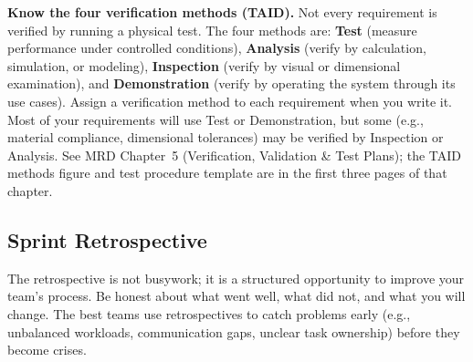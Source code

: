 \begin{tipbox}
\textbf{Know the four verification methods (TAID).} Not every requirement is verified by running a physical test. The four methods are: \textbf{Test} (measure performance under controlled conditions), \textbf{Analysis} (verify by calculation, simulation, or modeling), \textbf{Inspection} (verify by visual or dimensional examination), and \textbf{Demonstration} (verify by operating the system through its use cases). Assign a verification method to each requirement when you write it. Most of your requirements will use Test or Demonstration, but some (e.g., material compliance, dimensional tolerances) may be verified by Inspection or Analysis. See MRD Chapter~5 (Verification, Validation \& Test Plans); the TAID methods figure and test procedure template are in the first three pages of that chapter.
\end{tipbox}

\subsection{Sprint Retrospective}

\begin{faqbox}
The retrospective is not busywork; it is a structured opportunity to improve your team's process. Be honest about what went well, what did not, and what you will change. The best teams use retrospectives to catch problems early (e.g., unbalanced workloads, communication gaps, unclear task ownership) before they become crises.
\end{faqbox}

